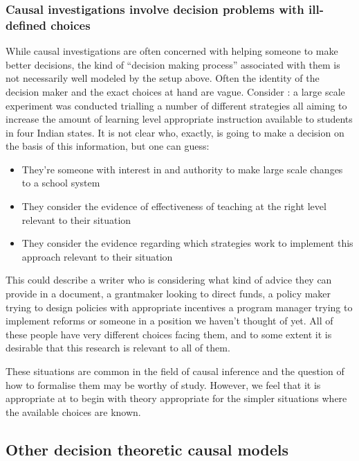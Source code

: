 \subsubsection{Causal investigations involve decision problems with ill-defined choices}

While causal investigations are often concerned with helping someone to make better decisions, the kind of ``decision making process'' associated with them is not necessarily well modeled by the setup above. Often the identity of the decision maker and the exact choices at hand are vague. Consider \citet{banerjee_mainstreaming_2016}: a large scale experiment was conducted trialling a number of different strategies all aiming to increase the amount of learning level appropriate instruction available to students in four Indian states. It is not clear who, exactly, is going to make a decision on the basis of this information, but one can guess:

\begin{itemize}
    \item They're someone with interest in and authority to make large scale changes to a school system
    \item They consider the evidence of effectiveness of teaching at the right level relevant to their situation
    \item They consider the evidence regarding which strategies work to implement this approach relevant to their situation
\end{itemize}

This could describe a writer who is considering what kind of advice they can provide in a document, a grantmaker looking to direct funds, a policy maker trying to design policies with appropriate incentives a program manager trying to implement reforms or someone in a position we haven't thought of yet. All of these people have very different choices facing them, and to some extent it is desirable that this research is relevant to all of them.

These situations are common in the field of causal inference and the question of how to formalise them may be worthy of study. However, we feel that it is appropriate at to begin with theory appropriate for the simpler situations where the available choices are known.

\subsection{Other decision theoretic causal models}

